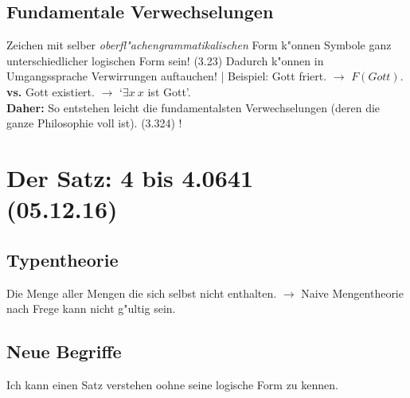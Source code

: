 \documentclass[emulatestandardclasses]{scrartcl}
\begin{document}
\subsection{Fundamentale Verwechselungen}
Zeichen mit selber \emph{oberfl"achengrammatikalischen} Form k"onnen Symbole ganz unterschiedlicher logischen Form sein! (3.23) Dadurch k"onnen in Umgangssprache Verwirrungen auftauchen! | Beispiel: Gott friert. $\rightarrow$ $F(Gott)$. \textbf{vs.} Gott existiert.  $\rightarrow$ `$\exists x~x$ ist Gott'.\\

\noindent \textbf{Daher:} So entstehen leicht die fundamentalsten Verwechselungen (deren die ganze Philosophie voll ist). (3.324) !


\section{Der Satz: 4 bis 4.0641\\(05.12.16)}

\vspace{10pt}

\subsection{Typentheorie}

\begin{description}[leftmargin=!,labelwidth=\widthof{\bfseries Typentheorie}]
  \item[Russells Paradox] Die Menge aller Mengen die sich selbst nicht enthalten. $\rightarrow$ Naive Mengentheorie nach Frege kann nicht g"ultig sein.
  \item[Typentheorie] 
\end{description}

\subsection{Neue Begriffe}

Ich kann einen Satz verstehen oohne seine logische Form zu kennen.
\end{document}
